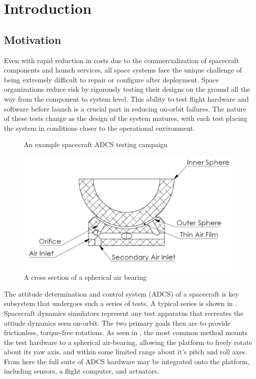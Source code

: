 \chapter{Introduction}

\section{Motivation}

Even with rapid reduction in costs due to the commercialization of spacecraft components and launch services, all space systems face the unique challenge of being extremely difficult to repair or configure after deployment. Space organizations reduce risk by rigorously testing their designs on the ground all the way from the component to system level. This ability to test flight hardware and software before launch is a crucial part in reducing on-orbit failures. The nature of these tests change as the design of the system matures, with each test placing the system in conditions closer to the operational environment. 

\begin{figure}[h]
    \centering
    
    \caption{An example spacecraft ADCS testing campaign}
    \label{fig:ADCS_tests}
\end{figure}

\begin{figure}[h]
    \centering
    \includegraphics[width=0.70\linewidth]{figures/cross_section.png}
    \caption{A cross section of a spherical air bearing \cite{huang_characterizing_2022}}
    \label{fig:cross_section}
\end{figure}

The attitude determination and control system (ADCS) of a spacecraft is key subsystem that undergoes such a series of tests. A typical series is shown in . Spacecraft dynamics simulators represent any test apparatus that recreates the attiude dynamics seen on-orbit.  The two primary goals then are to provide frictionless, torque-free rotations. As seen in , the most common method mounts the test hardware to a spherical air-bearing, allowing the platform to freely rotate about its yaw axis, and within some limited range about it's pitch and roll axes. From here the full suite of ADCS hardware may be integrated onto the platform, including sensors, a flight computer, and actuators. 

